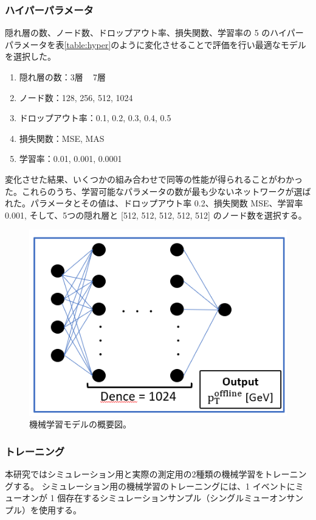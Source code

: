 \subsubsection{ハイパーパラメータ}
隠れ層の数、ノード数、ドロップアウト率、損失関数、学習率の 5 のハイパーパラメータを表\ref{table:hyper}のように変化させることで評価を行い最適なモデルを選択した。
\begin{enumerate}\label{table:hyper}
   \item 隠れ層の数：3層 ~ 7層
   \item ノード数：128, 256, 512, 1024
   \item ドロップアウト率：0.1, 0.2, 0.3, 0.4, 0.5
   \item 損失関数：MSE, MAS
   \item 学習率：0.01, 0.001, 0.0001
\end{enumerate}
変化させた結果、いくつかの組み合わせで同等の性能が得られることがわかった。これらのうち、学習可能なパラメータの数が最も少ないネットワークが選ばれた。パラメータとその値は、ドロップアウト率 0.2、損失関数 MSE、学習率 0.001, そして、5つの隠れ層と [512, 512, 512, 512, 512] のノード数を選択する。

\begin{figure}[tb]
  \centering
  \includegraphics[clip, width=12cm]{fig/4/MLP.png}
  \caption{機械学習モデルの概要図。}
  \label{fig:MLP_overview}
\end{figure}


\subsubsection{トレーニング}
本研究ではシミュレーション用と実際の測定用の2種類の機械学習をトレーニングする。
シミュレーション用の機械学習のトレーニングには、1 イベントにミューオンが 1 個存在するシミュレーションサンプル（シングルミューオンサンプル）を使用する。

